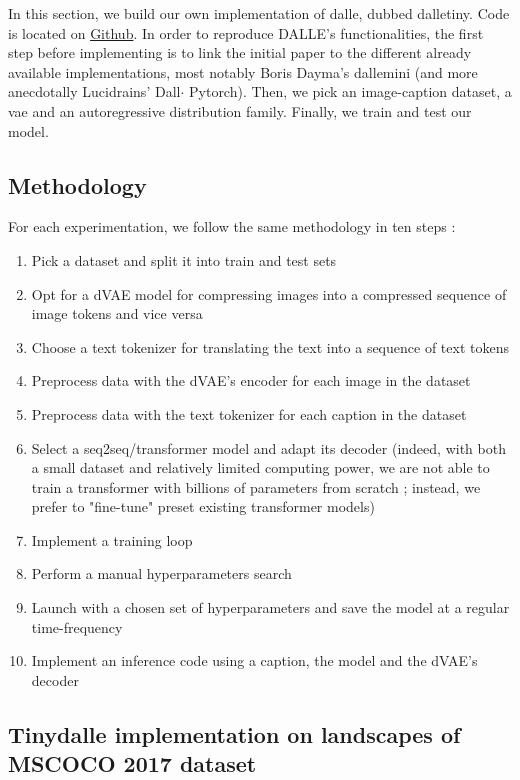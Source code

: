 \documentclass{article}
\begin{document}
\begin{multicols}{2}

In this section, we build our own implementation of \gls{dalle}, dubbed \gls{dalletiny}. Code is located on \href{https://github.com/cthiounn/dalle-tiny}{Github}. In order to reproduce DALLE's functionalities, the first step before implementing is to link the initial paper to the different already available implementations, most notably Boris Dayma's \gls{dallemini} (and more anecdotally Lucidrains' Dall$\cdot$ Pytorch). Then, we pick an image-caption dataset, a \gls{vae} and an autoregressive distribution family. Finally, we train and test our model.

\subsection{Methodology}

For each experimentation, we follow the same methodology in ten steps :

\begin{enumerate}
\item Pick a dataset and split it into train and test sets
    \item Opt for a dVAE model for compressing images into a compressed sequence of image tokens and vice versa
    \item Choose a text tokenizer for translating the text into a sequence of text tokens
    \item Preprocess data with the dVAE's encoder for each image in the dataset
    \item Preprocess data with the text tokenizer for each caption in the dataset
    \item Select a seq2seq/transformer model and adapt its decoder (indeed, with both a small dataset and relatively limited computing power, we are not able to train a transformer with billions of parameters from scratch ; instead, we prefer to "fine-tune" preset existing transformer models)
    \item Implement a training loop
    \item Perform a manual hyperparameters search
    \item Launch with a chosen set of hyperparameters and save the model at a regular time-frequency
    \item Implement an inference code using a caption, the model and the dVAE's decoder
\end{enumerate}

\subsection{Tinydalle implementation on landscapes of MSCOCO 2017 dataset}


\end{multicols}
\end{document}

